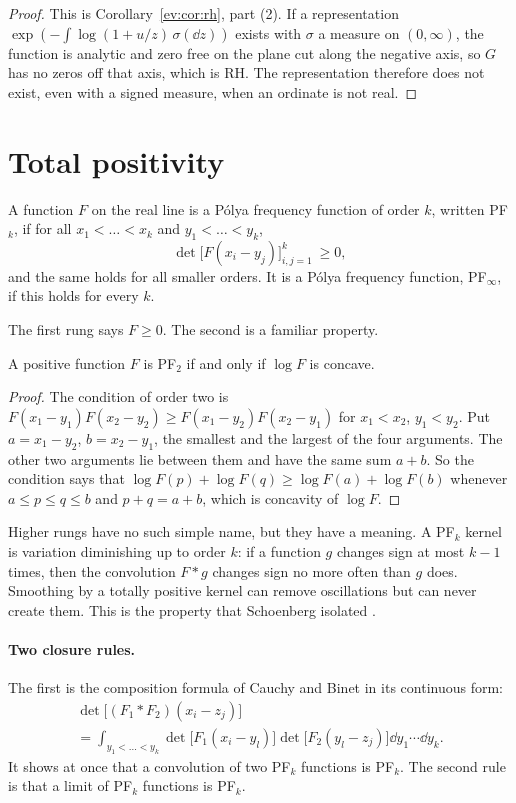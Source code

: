 \begin{proof}
This is Corollary~\ref{ev:cor:rh}, part (2). If a representation $\exp(-\int\log(1+u/z)\,\sigma(\dd z))$ exists with $\sigma$ a measure on $(0,\infty)$, the function is analytic and zero free on the plane cut along the negative axis, so $G$ has no zeros off that axis, which is RH. The representation therefore does not exist, even with a signed measure, when an ordinate is not real.
\end{proof}

\section{Total positivity}\label{t:sec:tp}

\begin{definition}
A function $F$ on the real line is a P\'olya frequency function of order $k$, written PF$_k$, if for all $x_1<\dots<x_k$ and $y_1<\dots<y_k$,
\[
\det\big[F(x_i-y_j)\big]_{i,j=1}^{k}\ \ge0,
\]
and the same holds for all smaller orders. It is a P\'olya frequency function, PF$_\infty$, if this holds for every $k$.
\end{definition}

The first rung says $F\ge0$. The second is a familiar property.

\begin{lemma}\label{t:lem:pf2}
A positive function $F$ is PF$_2$ if and only if $\log F$ is concave.
\end{lemma}

\begin{proof}
The condition of order two is $F(x_1-y_1)F(x_2-y_2)\ge F(x_1-y_2)F(x_2-y_1)$ for $x_1<x_2$, $y_1<y_2$. Put $a=x_1-y_2$, $b=x_2-y_1$, the smallest and the largest of the four arguments. The other two arguments lie between them and have the same sum $a+b$. So the condition says that $\log F(p)+\log F(q)\ge\log F(a)+\log F(b)$ whenever $a\le p\le q\le b$ and $p+q=a+b$, which is concavity of $\log F$.
\end{proof}

Higher rungs have no such simple name, but they have a meaning. A PF$_k$ kernel is variation diminishing up to order $k$: if a function $g$ changes sign at most $k-1$ times, then the convolution $F*g$ changes sign no more often than $g$ does. Smoothing by a totally positive kernel can remove oscillations but can never create them. This is the property that Schoenberg isolated \cite{Schoenberg51,Karlin68}.

\paragraph{Two closure rules.} The first is the composition formula of Cauchy and Binet in its continuous form:
\begin{multline}\label{t:eq:cb}
\det\big[(F_1*F_2)(x_i-z_j)\big]\\
=\int_{y_1<\dots<y_k}\det\big[F_1(x_i-y_l)\big]\det\big[F_2(y_l-z_j)\big]\dd y_1\cdots\dd y_k .
\end{multline}
It shows at once that a convolution of two PF$_k$ functions is PF$_k$. The second rule is that a limit of PF$_k$ functions is PF$_k$.


